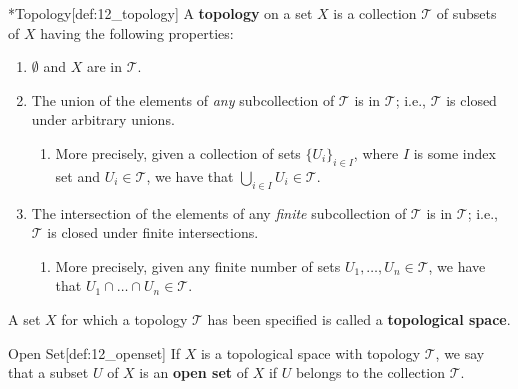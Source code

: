 \begin{defBox}*{Topology}[def:12_topology]
    A \textbf{topology} on a set \( X \) is a collection \( \mathcal{T} \) of 
    subsets of \( X \) having the following properties:
    \begin{enumerate}
        \item \( \emptyset \) and \( X \) are in \( \mathcal{T} \).
        \item The union of the elements of \textit{any} subcollection of 
            \( \mathcal{T} \) is in \( \mathcal{T} \); i.e.,
            \( \mathcal{T} \) is closed under arbitrary unions.
            \begin{enumerate}
                \item More precisely, given a collection of sets 
                    \( \{ U_{ i } \}_{ i \in I } \), where \( I \) is
                    some index set and \( U_{ i } \in \mathcal{T} \), we have
                    that 
                    \( \bigcup_{ i \in I } U_{ i } \in \mathcal{T} \).
            \end{enumerate}
        \item The intersection of the elements of any \textit{finite} 
            subcollection of \( \mathcal{T} \)
            is in \( \mathcal{T} \); i.e., \( \mathcal{T} \) is closed under 
            finite intersections.
            \begin{enumerate}
                \item More precisely, given any finite number of sets 
                    \( U_{ 1 }, \ldots, U_{ n } \in \mathcal{T} \), we have
                    that \( U_{ 1 } \cap \ldots \cap U_{ n } \in \mathcal{T} \).
            \end{enumerate}
    \end{enumerate}
    A set \( X \) for which a topology \( \mathcal{T} \) has been specified is 
    called a \textbf{topological space}.
\end{defBox}

\begin{defBox}{Open Set}[def:12_openset]
    If \( X \) is a topological space with topology \( \mathcal{T} \), we say 
    that a subset \( U \) of \( X \) is an
    \textbf{open set} of \( X \) if \( U \) belongs to the collection 
    \( \mathcal{T} \).
\end{defBox}

